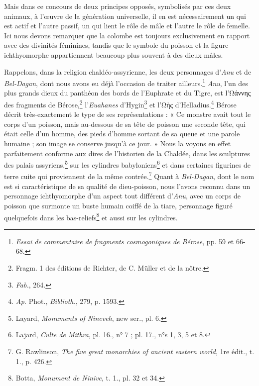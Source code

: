 \documentclass[a4paper, 11pt, oneside, landscape]{article}
\begin{document}
Mais dans ce concours de deux principes opposés, symbolisés par ces deux animaux, à l'œuvre de la génération universelle, il en est nécessairement un qui est actif et l'autre passif, un qui lient le rôle de mâle et l'autre le rôle de femelle. Ici nous devons remarquer que la colombe est toujours exclusivement en rapport avec des divinités féminines, tandis que le symbole du poisson et la figure ichthyomorphe appartiennent beaucoup plus souvent à des dieux mâles.

Rappelons, dans la religion chaldéo-assyrienne, les deux personnages d'\emph{Anu} et de \emph{Bel-Dagan}, dont nous avons eu déjà l'occasion de traiter ailleurs.\footnote{\emph{Essai de commentaire de fragments cosmogoniques de Bérose}, pp. 59 et 66-68.} \emph{Anu}, l'un des plus grands dieux du panthéon des bords de l'Euphrate et du Tigre, est l'Ωάννης des fragments de Bérose,\footnote{Fragm. 1 des éditions de Richter, de C. Müller et de la nôtre.} l'\emph{Euahanes} d'Hygin\footnote{\emph{Fab.}, 264.} et l'Ωὴς d'Helladius.\footnote{\emph{Ap.} Phot., \emph{Biblioth.}, 279, p. 1593.} Bérose décrit très-exactement le type de ses représentations : « Ce monstre avait tout le corps d'un poisson, mais au-dessous de sa tête de poisson une seconde tête, qui était celle d'un homme, des pieds d'homme sortant de sa queue et une parole humaine ; son image se conserve jusqu'à ce jour. » Nous la voyons en effet parfaitement conforme aux dires de l'historien de la Chaldée, dans les sculptures des palais assyriens,\footnote{Layard, \emph{Monuments of Nineveh}, new ser., pl. 6.} sur les cylindres babyloniens\footnote{Lajard, \emph{Culte de Mithra}, pl. 16., n° 7 ; pl. 17., n°s 1, 3, 5 et 8.} et dans certaines figurines de terre cuite qui proviennent de la même contrée.\footnote{G. Rawlinson, \emph{The five great monarchies of ancient eastern world}, 1re édit., t. 1., p. 426.} Quant à \emph{Bel-Dagan}, dont le nom est si caractéristique de sa qualité de dieu-poisson, nous l'avons reconnu dans un personnage ichthyomorphe d'un aspect tout différent d'\emph{Anu}, avec un corps de poisson que surmonte un buste humain coiffé de la tiare, personnage figuré quelquefois dans les bas-reliefs\footnote{Botta, \emph{Monument de Ninive}, t. 1., pl. 32 et 34.} et aussi sur les cylindres.
\end{document}
